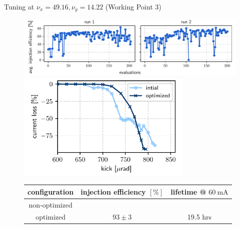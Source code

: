 \documentclass[aspectratio=169]{beamer}
\begin{document}
\begin{frame}{Tuning at $\nu_x = 49.16, \nu_y = 14.22$ (Working Point 3)}
    \begin{minipage}{0.55\textwidth}
        \begin{figure}
            \centering
            \includegraphics[width=\textwidth]{wp3_history.pdf}
            \pause
            \includegraphics[width = 0.75\textwidth]{wp3_kick_resilience.pdf}
            \pause
            \begin{table}[]
                \scriptsize
                \begin{tabular}{ccc}
                \hline
                configuration & injection efficiency $[\%]$  & lifetime @ $\unit{60~\milli\ampere}$  \\ \hline
                non-optimized        &                       &          \\
                optimized            & $93\pm3$              &    19.5 hrs   \\ \hline
                \end{tabular}
                \end{table}
        \end{figure}
    \end{minipage}
    \pause
    \hfill
    \begin{minipage}{0.44\textwidth}
        \begin{figure}
            \centering

\end{figure}
\end{minipage}
\end{frame}
\end{document}

